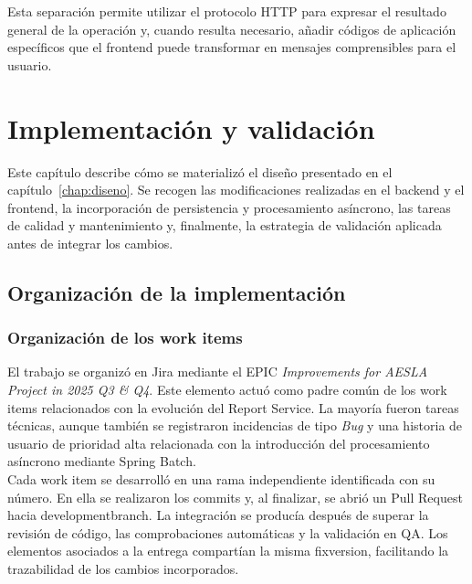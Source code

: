 \documentclass[11pt,a4paper,titlepage,oneside]{report}
\begin{document}
Esta separación permite utilizar el protocolo HTTP para expresar el resultado
general de la operación y, cuando resulta necesario, añadir códigos de
aplicación específicos que el frontend puede transformar en mensajes
comprensibles para el usuario. \\


\chapter{Implementación y validación}
\label{chap:implementacion}

Este capítulo describe cómo se materializó el diseño presentado en el
capítulo~\ref{chap:diseno}. Se recogen las modificaciones realizadas en el
backend y el frontend, la incorporación de persistencia y procesamiento
asíncrono, las tareas de calidad y mantenimiento y, finalmente, la estrategia
de validación aplicada antes de integrar los cambios.

\section{Organización de la implementación}

\subsection{Organización de los work items}

El trabajo se organizó en Jira mediante el EPIC
\textit{Improvements for AESLA Project in 2025 Q3 \& Q4}. Este elemento actuó
como padre común de los work items relacionados con la evolución del Report
Service. La mayoría fueron tareas técnicas, aunque también se registraron
incidencias de tipo \textit{Bug} y una historia de usuario de prioridad alta
relacionada con la introducción del procesamiento asíncrono mediante Spring
Batch. \\

Cada work item se desarrolló en una rama independiente identificada con su
número. En ella se realizaron los commits y, al finalizar, se abrió un Pull
Request hacia \gls{developmentbranch}. La integración se producía después de
superar la revisión de código, las comprobaciones automáticas y la validación
en QA. Los elementos asociados a la entrega compartían la misma
\gls{fixversion}, facilitando la trazabilidad de los cambios incorporados. \\
\end{document}
